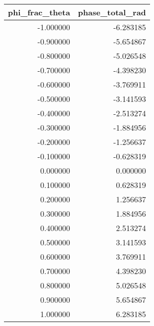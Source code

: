 \begin{tabular}{rr}
\toprule
phi_frac_theta & phase_total_rad \\
\midrule
-1.000000 & -6.283185 \\
-0.900000 & -5.654867 \\
-0.800000 & -5.026548 \\
-0.700000 & -4.398230 \\
-0.600000 & -3.769911 \\
-0.500000 & -3.141593 \\
-0.400000 & -2.513274 \\
-0.300000 & -1.884956 \\
-0.200000 & -1.256637 \\
-0.100000 & -0.628319 \\
0.000000 & 0.000000 \\
0.100000 & 0.628319 \\
0.200000 & 1.256637 \\
0.300000 & 1.884956 \\
0.400000 & 2.513274 \\
0.500000 & 3.141593 \\
0.600000 & 3.769911 \\
0.700000 & 4.398230 \\
0.800000 & 5.026548 \\
0.900000 & 5.654867 \\
1.000000 & 6.283185 \\
\bottomrule
\end{tabular}
